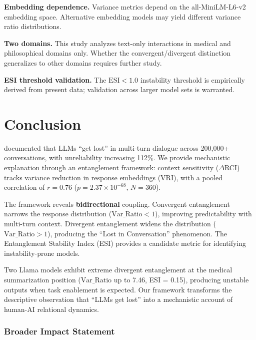 \documentclass[11pt]{article}
\begin{document}
\textbf{Embedding dependence.} Variance metrics depend on the all-MiniLM-L6-v2 embedding space. Alternative embedding models may yield different variance ratio distributions.

\textbf{Two domains.} This study analyzes text-only interactions in medical and philosophical domains only. Whether the convergent/divergent distinction generalizes to other domains requires further study.

\textbf{ESI threshold validation.} The $\text{ESI} < 1.0$ instability threshold is empirically derived from present data; validation across larger model sets is warranted.

\section{Conclusion}

\citet{laban2025lost} documented that LLMs ``get lost'' in multi-turn dialogue across 200,000+ conversations, with unreliability increasing 112\%. We provide mechanistic explanation through an entanglement framework: context sensitivity ($\Delta$RCI) tracks variance reduction in response embeddings (VRI), with a pooled correlation of $r = 0.76$ ($p = 2.37 \times 10^{-68}$, $N = 360$).

The framework reveals \textbf{bidirectional} coupling. Convergent entanglement narrows the response distribution ($\text{Var\_Ratio} < 1$), improving predictability with multi-turn context. Divergent entanglement widens the distribution ($\text{Var\_Ratio} > 1$), producing the ``Lost in Conversation'' phenomenon. The Entanglement Stability Index (ESI) provides a candidate metric for identifying instability-prone models.

Two Llama models exhibit extreme divergent entanglement at the medical summarization position ($\text{Var\_Ratio}$ up to 7.46, ESI = 0.15), producing unstable outputs when task enablement is expected. Our framework transforms the descriptive observation that ``LLMs get lost'' into a mechanistic account of human-AI relational dynamics.

\subsubsection*{Broader Impact Statement}
\end{document}
